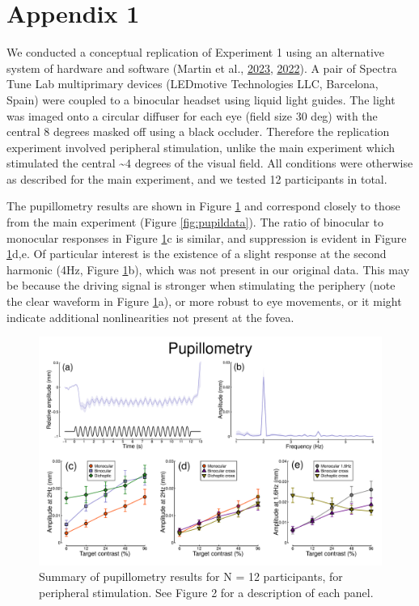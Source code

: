 \documentclass[
]{article}
\newcommand{\beginsupplement}{\setcounter{table}{0}
\renewcommand{\thetable}{A\arabic{table}}
\setcounter{figure}{0}
\renewcommand{\thefigure}{A\arabic{figure}}}
\begin{document}
\hypertarget{appendix-1}{%
\section{Appendix 1}\label{appendix-1}}

\beginsupplement

We conducted a conceptual replication of Experiment 1 using an alternative system of hardware and software (Martin et al., \protect\hyperlink{ref-Martin2023}{2023}, \protect\hyperlink{ref-Martin2022}{2022}). A pair of Spectra Tune Lab multiprimary devices (LEDmotive Technologies LLC, Barcelona, Spain) were coupled to a binocular headset using liquid light guides. The light was imaged onto a circular diffuser for each eye (field size 30 deg) with the central 8 degrees masked off using a black occluder. Therefore the replication experiment involved peripheral stimulation, unlike the main experiment which stimulated the central \textasciitilde4 degrees of the visual field. All conditions were otherwise as described for the main experiment, and we tested 12 participants in total.

The pupillometry results are shown in Figure \ref{fig:appendixfig1} and correspond closely to those from the main experiment (Figure \ref{fig:pupildata}). The ratio of binocular to monocular responses in Figure \ref{fig:appendixfig1}c is similar, and suppression is evident in Figure \ref{fig:appendixfig1}d,e. Of particular interest is the existence of a slight response at the second harmonic (4Hz, Figure \ref{fig:appendixfig1}b), which was not present in our original data. This may be because the driving signal is stronger when stimulating the periphery (note the clear waveform in Figure \ref{fig:appendixfig1}a), or more robust to eye movements, or it might indicate additional nonlinearities not present at the fovea.

\begin{figure}

{\centering \includegraphics{Figures/pupildataRep} 

}

\caption{Summary of pupillometry results for N = 12 participants, for peripheral stimulation. See Figure 2 for a description of each panel.}\label{fig:appendixfig1}
\end{figure}
\end{document}

